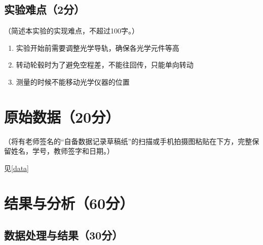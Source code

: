 \documentclass[]{../template/Report}%
\begin{document}
\subsection{实验难点（2分）}
（简述本实验的实现难点，不超过100字。）
\begin{enumerate}
    \item 实验开始前需要调整光学导轨，确保各光学元件等高
    \item 转动轮毂时为了避免空程差，不能往回传，只能单向转动
    \item 测量的时候不能移动光学仪器的位置
\end{enumerate}
\begin{fullreportonly}
\section{原始数据（20分）}
（将有老师签名的“自备数据记录草稿纸”的扫描或手机拍摄图粘贴在下方，完整保留姓名，学号，教师签字和日期。）

见\cref{data}
\section{结果与分析（60分）}
\subsection{数据处理与结果（30分）}

\end{fullreportonly}
\end{document}
